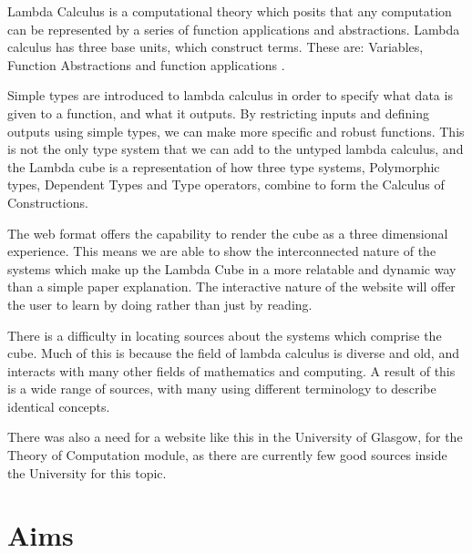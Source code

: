 \documentclass{l4proj}
\begin{document}
Lambda Calculus is a computational theory which posits that any computation can be represented by a series of function applications and abstractions.  Lambda calculus has three base units, which construct terms.  These are: Variables, Function Abstractions and function applications \cite{tapl}.

Simple types are introduced to lambda calculus in order to specify what data is given to a function, and what it outputs. By restricting inputs and defining outputs using simple types, we can make more specific and robust functions.  This is not the only type system that we can add to the untyped lambda calculus, and the Lambda cube is a representation of how three type systems, Polymorphic types, Dependent Types and Type operators, combine to form the Calculus of Constructions.

The web format offers the capability to render the cube as a three dimensional experience. This means we are able to show the interconnected nature of the systems which make up the Lambda Cube in a more relatable and dynamic way than a simple paper explanation.  The interactive nature of the website will offer the user to learn by doing rather than just by reading.

There is a difficulty in locating sources about the systems which comprise the cube.  Much of this is because the field of lambda calculus is diverse and old, and interacts with many other fields of mathematics and computing.  A result of this is a wide range of sources, with many using different terminology to describe identical concepts.

There was also a need for a website like this in the University of Glasgow, for the Theory of Computation module, as there are currently few good sources inside the University for this topic.

\section{Aims}
\end{document}
